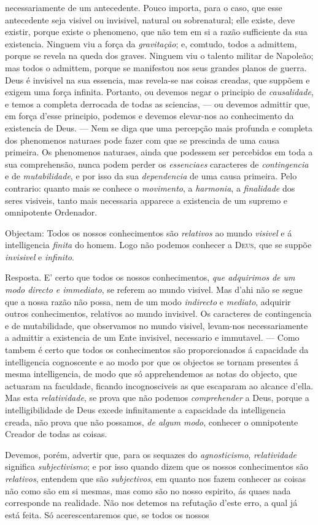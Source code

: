 necessariamente de um antecedente. Pouco importa, para o caso, que esse antecedente seja visivel ou invisivel, natural ou sobrenatural; elle existe, deve existir, porque existe o phenomeno, que não tem em si a razão sufficiente da sua existencia. Ninguem viu a força da \emph{gravitação}; e, comtudo, todos a admittem, porque se revela na queda dos graves. Ninguem viu o talento militar de Napoleão; mas todos o admittem, porque se manifestou nos seus grandes planos de guerra. Deus é invisivel na sua essencia, mas revela-se nas coisas creadas, que suppõem e exigem uma força infinita. Portanto, ou devemos negar o principio de \emph{causalidade}, e temos a completa derrocada de todas as sciencias, --- ou devemos admittir que, em força d'esse principio, podemos e devemos elevar-nos ao conhecimento da existencia de Deus. --- Nem se diga que uma percepção mais profunda e completa dos phenomenos naturaes pode fazer com que se prescinda de uma causa primeira. Os phenomenos naturaes, ainda que podessem ser percebidos em toda a sua comprehensão, nunca podem perder os \emph{essenciaes} caracteres de \emph{contingencia} e de \emph{mutabilidade}, e por isso da sua \emph{dependencia} de uma causa primeira. Pelo contrario: quanto mais se conhece o \emph{movimento}, a \emph{harmonia}, a \emph{finalidade} dos seres visiveis, tanto mais necessaria apparece a existencia de um supremo e omnipotente Ordenador.\par Objectam: Todos os nossos conhecimentos são \emph{relativos} ao mundo \emph{visivel} e á intelligencia \emph{finita} do homem. Logo não podemos conhecer a \textsc{Deus}, que se suppõe \emph{invisivel} e \emph{infinito}.\par Resposta. E' certo que todos os nossos conhecimentos, \emph{que adquirimos} \emph{de um modo directo e immediato}, se referem ao mundo visivel. Mas d'ahi não se segue que a nossa razão não possa, nem de um modo \emph{indirecto} e \emph{mediato}, adquirir outros conhecimentos, relativos ao mundo invisivel. Os caracteres de contingencia e de mutabilidade, que observamos no mundo visivel, levam-nos necessariamente a admittir a existencia de um Ente invisivel, necessario e immutavel. --- Como tambem é certo que todos os conhecimentos são proporcionados á capacidade da intelligencia cognoscente e ao modo por que os objectos se tornam presentes á mesma intelligencia, de modo que só apprehendemos as notas do objecto, que actuaram na faculdade, ficando incognosciveis as que escaparam ao alcance d'ella. Mas esta \emph{relatividade}, se prova que não podemos \emph{comprehender} a Deus, porque a intelligibilidade de Deus excede infinitamente a capacidade da intelligencia creada, não prova que não possamos, \emph{de algum modo}, conhecer o omnipotente Creador de todas as coisas.\par Devemos, porém, advertir que, para os sequazes do \emph{agnosticismo}, \emph{relatividade} significa \emph{subjectivismo}; e por isso quando dizem que os nossos conhecimentos são \emph{relativos}, entendem que são \emph{subjectivos}, em quanto nos fazem conhecer as coisas não como são em si mesmas, mas como são no nosso espirito, ás quaes nada corresponde na realidade. Não nos detemos na refutação d'este erro, a qual já está feita. Só acerescentaremos que, se todos os nossos 